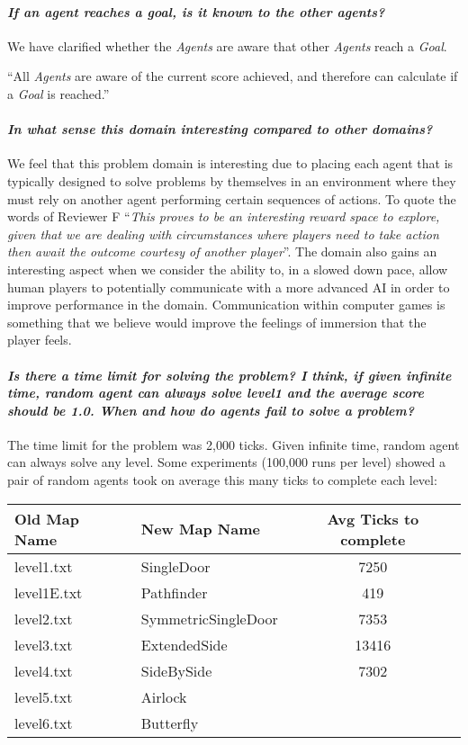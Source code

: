 \documentclass{article}
\begin{document}
\paragraph*{\textit{If an agent reaches a goal, is it known to the other agents?}}
We have clarified whether the \emph{Agents} are aware that other \emph{Agents} reach a \emph{Goal}.

``All \emph{Agents} are aware of the current score achieved, and therefore can calculate if a \emph{Goal} is reached.''

\paragraph*{\textit{In what sense this domain interesting compared to other domains?}}
We feel that this problem domain is interesting due to placing each agent that is typically designed to solve problems by themselves in an environment where they must rely on another agent performing certain sequences of actions. To quote the words of Reviewer F ``\textit{This proves to be an interesting reward space to explore, given that we are dealing with circumstances where players need to take action then await the outcome courtesy of another player}''. The domain also gains an interesting aspect when we consider the ability to, in a slowed down pace, allow human players to potentially communicate with a more advanced AI in order to improve performance in the domain. Communication within computer games is something that we believe would improve the feelings of immersion that the player feels.

\paragraph*{\textit{Is there a time limit for solving the problem? I think, if given infinite time, random agent can always solve level1 and the average score should be 1.0.
When and how do agents fail to solve a problem?}}
The time limit for the problem was 2,000 ticks. Given infinite time, random agent can always solve any level. Some experiments (100,000 runs per level) showed a pair of random agents took on average this many ticks to complete each level:

\begin{tabular}{|l|l|c|}
\hline
\textbf{Old Map Name} & \textbf{New Map Name} & \textbf{Avg Ticks to complete} \\
\hline
level1.txt & SingleDoor & 7250\\
\hline
level1E.txt & Pathfinder & 419\\
\hline
level2.txt & SymmetricSingleDoor & 7353\\
\hline
level3.txt & ExtendedSide& 13416\\
\hline
level4.txt & SideBySide & 7302\\
\hline
level5.txt & Airlock & \\
\hline
level6.txt & Butterfly & \\
\hline
\end{tabular}
\end{document}
